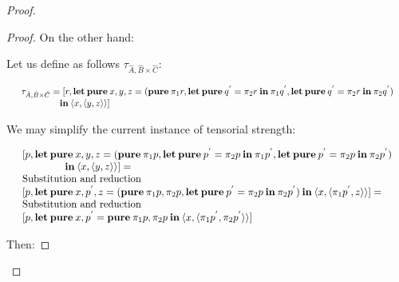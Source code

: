 \documentclass[a4paper]{article}
\begin{document}
\begin{proof}
\begin{proof}
\vspace{\baselineskip}

On the other hand:

\vspace{\baselineskip}

Let us define as follows $\tau_{\hat{A}, \hat{B} \times \hat{C}}$:

$\begin{array}{lll}
&\tau_{\hat{A}, \hat{B} \times \hat{C}} = [r, {\bf let \: pure \:} x, y, z = ({\bf pure \:} \pi_1 r, {\bf let \: pure \:} q^{'} = \pi_2 r {\: \bf in \:} \pi_1 q^{'}, {\bf let \: pure \:} q^{'} = \pi_2 r {\: \bf in \:} \pi_2 q^{'}) & \\
&\quad\quad\quad\quad {\: \bf in \:} \langle x, \langle y, z \rangle\rangle]& \\
\end{array}$

\vspace{\baselineskip}

We may simplify the current instance of tensorial strength:

$\begin{array}{lll}
&[p, {\bf let \: pure \:} x, y, z = ({\bf pure \:} \pi_1 p, {\bf let \: pure \:} p^{'} = \pi_2 p {\: \bf in \:} \pi_1 p^{'}, {\bf let \: pure \:} p^{'} = \pi_2 p {\: \bf in \:} \pi_2 p^{'}) & \\
&\quad\quad\quad\quad {\: \bf in \:} \langle x, \langle y, z \rangle\rangle] = & \\
&\text{Substitution and reduction}& \\
&[p, {\bf let \: pure \:} x, p^{'}, z = ({\bf pure \:} \pi_1 p, \pi_2 p, {\bf let \: pure \:} p^{'} = \pi_2 p {\: \bf in \:} \pi_2 p^{'}) {\: \bf in \:} \langle x, \langle \pi_1 p^{'}, z \rangle\rangle] = & \\
&\text{Substitution and reduction}& \\
&[p, {\bf let \: pure \:} x, p^{'} = {\bf pure \:} \pi_1 p, \pi_2 p {\: \bf in \:} \langle x, \langle \pi_1 p^{'}, \pi_2 p^{'} \rangle\rangle]&
\end{array}$

\vspace{\baselineskip}

Then:

\vspace{\baselineskip}


\end{proof}
\end{proof}
\end{document}
